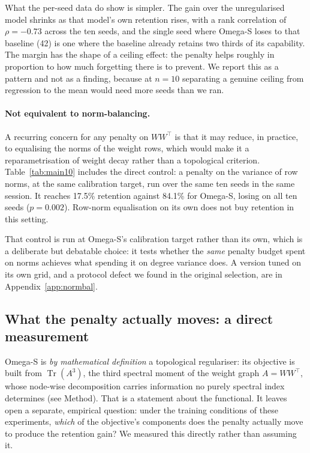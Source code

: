 \documentclass[11pt,a4paper]{article}
\begin{document}
What the per-seed data do show is simpler. The gain over the unregularised model
shrinks as that model's own retention rises, with a rank correlation of
$\rho = -0.73$ across the ten seeds, and the single seed where Omega-S loses to
that baseline (42) is one where the baseline already retains two thirds of its
capability. The margin has the shape of a ceiling effect: the penalty helps
roughly in proportion to how much forgetting there is to prevent. We report this
as a pattern and not as a finding, because at $n = 10$ separating a genuine
ceiling from regression to the mean would need more seeds than we ran.

\paragraph{Not equivalent to norm-balancing.} A recurring concern for any
penalty on $WW^\top$ is that it may reduce, in practice, to equalising the norms
of the weight rows, which would make it a reparametrisation of weight decay
rather than a topological criterion. Table~\ref{tab:main10} includes the direct
control: a penalty on the variance of row norms, at the same calibration target,
run over the same ten seeds in the same session. It reaches 17.5\%
retention against 84.1\% for Omega-S, losing on all ten seeds
($p = 0.002$). Row-norm equalisation on its own does not buy retention in this
setting.

That control is run at Omega-S's calibration target rather than its own, which
is a deliberate but debatable choice: it tests whether the \emph{same} penalty
budget spent on norms achieves what spending it on degree variance does. A
version tuned on its own grid, and a protocol defect we found in the original
selection, are in Appendix~\ref{app:normbal}.

\subsection{What the penalty actually moves: a direct measurement}
\label{sec:mech}
\label{sec:mechanism}

Omega-S is \emph{by mathematical definition} a topological regulariser: its
objective is built from $\operatorname{Tr}(A^3)$, the third spectral moment
of the weight graph $A=WW^\top$, whose node-wise decomposition carries
information no purely spectral index determines (see Method).
That is a statement about the functional. It leaves open a separate,
empirical question: under the training conditions of these experiments,
\emph{which} of the objective's components does the penalty actually move to
produce the retention gain? We measured this directly rather than assuming
it.
\end{document}
